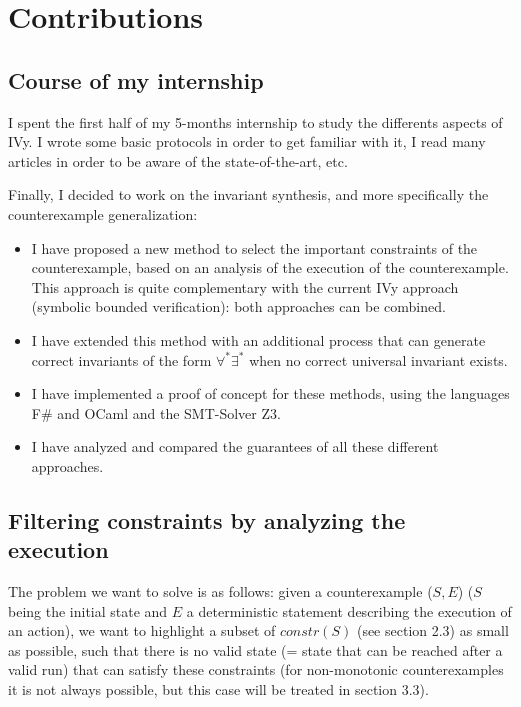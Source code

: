\documentclass[11pt,a4paper,oldfontcommands,openany]{memoir}
\begin{document}
\chapter{Contributions}

    \section{Course of my internship}

    I spent the first half of my 5-months internship to study the differents aspects of IVy. I wrote some basic protocols in order to get
    familiar with it, I read many articles in order to be aware of the state-of-the-art, etc.

    Finally, I decided to work on the invariant synthesis, and more specifically the counterexample generalization:
    \begin{itemize}
        \item I have proposed a new method to select the important constraints of the counterexample, based on an analysis of the execution of the counterexample.
        This approach is quite complementary with the current IVy approach (symbolic bounded verification): both approaches can be combined. 
        \item I have extended this method with an additional process that can generate correct invariants of the form \(\forall^*\exists^*\)
        when no correct universal invariant exists.
        \item I have implemented a proof of concept for these methods, using the languages F\# and OCaml and the SMT-Solver Z3\cite{z3ref}.        
        \item I have analyzed and compared the guarantees of all these different approaches.
    \end{itemize}

    \section{Filtering constraints by analyzing the execution}

    The problem we want to solve is as follows: given a counterexample (\(S,E\)) (\(S\) being the initial state and \(E\) a deterministic statement describing the execution of an action),
    we want to highlight a subset of \(constr(S)\) (see section 2.3) as small as possible, such that there is no valid state (= state that can be reached after a valid run) that can satisfy these constraints
    (for non-monotonic counterexamples it is not always possible, but this case will be treated in section 3.3).
\end{document}
